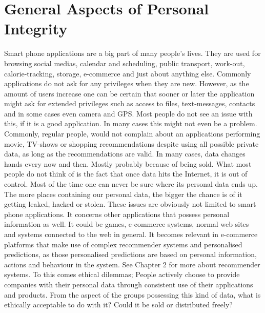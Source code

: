 \section{General Aspects of Personal Integrity}
Smart phone applications are a big part of many people's lives. They are used for browsing social medias, calendar and scheduling, public transport, work-out, calorie-tracking, storage, e-commerce and just about anything else. Commonly applications do not ask for any privileges when they are new. However, as the amount of users increase one can be certain that sooner or later the application might ask for extended privileges such as access to files, text-messages, contacts and in some cases even camera and GPS. Most people do not see an issue with this, if it is a good application. In many cases this might not even be a problem. Commonly, regular people, would not complain about an applications performing movie, TV-shows or shopping recommendations despite using all possible private data, as long as the recommendations are valid. In many cases, data changes hands every now and then. Mostly probably because of being sold. What most people do not think of is the fact that once data hits the Internet, it is out of control. Most of the time one can never be sure where its personal data ends up. The more places containing our personal data, the bigger the chance is of it getting leaked, hacked or stolen. These issues are obviously not limited to smart phone applications. It concerns other applications that possess personal information as well. It could be games, e-commerce systems, normal web sites and systems connected to the web in general. It becomes relevant in e-commerce platforms that make use of complex recommender systems and personalised predictions, as those personalised predictions are based on personal information, actions and behaviour in the system. See Chapter 2 for more about recommender systems. To this comes ethical dilemmas; People actively choose to provide companies with their personal data through consistent use of their applications and products. From the aspect of the groups possessing this kind of data, what is ethically acceptable to do with it? Could it be sold or distributed freely?

